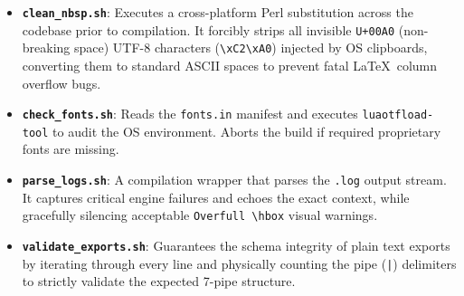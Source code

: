 \begin{itemize}
    \item \textbf{\texttt{clean\_nbsp.sh}}: Executes a cross-platform Perl substitution across the codebase prior to compilation. It forcibly strips all invisible \texttt{U+00A0} (non-breaking space) UTF-8 characters (\texttt{\textbackslash xC2\textbackslash xA0}) injected by OS clipboards, converting them to standard ASCII spaces to prevent fatal \LaTeX\ column overflow bugs.
    \item \textbf{\texttt{check\_fonts.sh}}: Reads the \texttt{fonts.in} manifest and executes \texttt{luaotfload-tool} to audit the OS environment. Aborts the build if required proprietary fonts are missing.
    \item \textbf{\texttt{parse\_logs.sh}}: A compilation wrapper that parses the \texttt{.log} output stream. It captures critical engine failures and echoes the exact context, while gracefully silencing acceptable \texttt{Overfull \textbackslash hbox} visual warnings.
    \item \textbf{\texttt{validate\_exports.sh}}: Guarantees the schema integrity of plain text exports by iterating through every line and physically counting the pipe (\texttt{|}) delimiters to strictly validate the expected 7-pipe structure.
\end{itemize}
